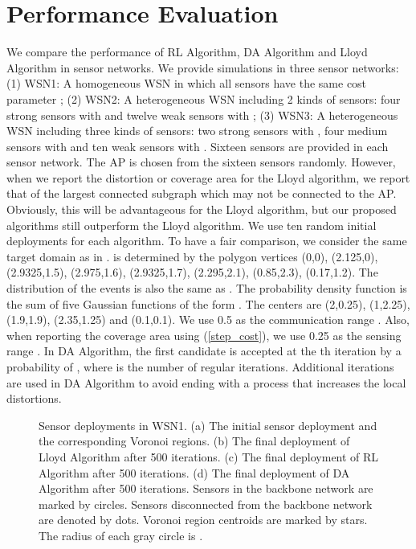 \documentclass[journal,draftcls,onecolumn,12pt,twoside, narroweqnarray]{IEEEtran}
\begin{document}
\section{Performance Evaluation}
We compare the performance of RL Algorithm, DA Algorithm and Lloyd Algorithm in sensor networks. We provide simulations in three sensor networks: (1) WSN1: A homogeneous WSN in which all sensors have the same cost parameter ; (2) WSN2: A heterogeneous WSN including 2 kinds of sensors: four strong sensors with  and twelve weak sensors with ; (3) WSN3: A heterogeneous WSN including three kinds of sensors: two strong sensors with , four medium sensors with  and ten weak sensors with . Sixteen sensors are provided in each sensor network.  The AP is chosen from the sixteen sensors randomly. However, when we report the distortion or coverage area for the Lloyd algorithm, we report that of the largest connected subgraph which may not be connected to the AP. Obviously, this will be advantageous for the Lloyd algorithm, but our proposed algorithms still outperform the Lloyd algorithm. We use ten random initial deployments for each algorithm. To have a fair comparison, we consider the same target domain  as in \cite{SD}.  is determined by the polygon vertices
{(0,0), (2.125,0), (2.9325,1.5), (2.975,1.6), (2.9325,1.7), (2.295,2.1), (0.85,2.3), (0.17,1.2)}. The distribution of the events is also the same as \cite{SD}. The probability density function is the sum of five Gaussian functions of the form . The centers  are (2,0.25), (1,2.25), (1.9,1.9), (2.35,1.25) and (0.1,0.1). We use 0.5 as the communication range . Also, when reporting the coverage area using (\ref{step_cost}), we use 0.25 as the sensing range . In DA Algorithm, the first candidate is accepted at the th iteration by a probability of , where  is the number of regular iterations. Additional  iterations are used in DA Algorithm to avoid ending with a process that increases the local distortions.
\begin{figure*}[!t]
\centering
{}
\hfil
{}
\hfil
{}
\hfil
{}
\caption{Sensor deployments in WSN1. (a) The initial sensor deployment and the corresponding Voronoi regions. (b) The final deployment of Lloyd Algorithm after 500 iterations. (c) The final deployment of RL Algorithm after 500 iterations. (d) The final deployment of DA Algorithm after 500 iterations. Sensors in the backbone network are marked by circles. Sensors disconnected from the backbone network are denoted by dots. Voronoi region centroids are marked by stars. The radius of each gray circle is .}
\label{Deployment In WSN1}
\end{figure*}
\end{document}
